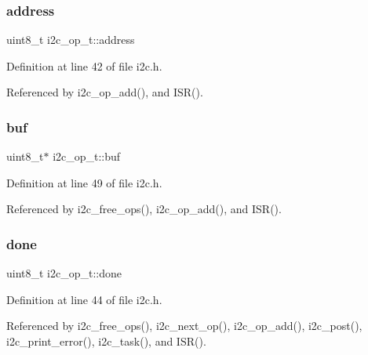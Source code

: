 \subsubsection{\texorpdfstring{address}{address}}
{\footnotesize\ttfamily uint8\+\_\+t i2c\+\_\+op\+\_\+t\+::address}



Definition at line 42 of file i2c.\+h.



Referenced by i2c\+\_\+op\+\_\+add(), and I\+S\+R().

\mbox{\label{structi2c__op__t_a1b38c7b78966e4464cfb858f223bf89a}} 
\subsubsection{\texorpdfstring{buf}{buf}}
{\footnotesize\ttfamily uint8\+\_\+t$\ast$ i2c\+\_\+op\+\_\+t\+::buf}



Definition at line 49 of file i2c.\+h.



Referenced by i2c\+\_\+free\+\_\+ops(), i2c\+\_\+op\+\_\+add(), and I\+S\+R().

\mbox{\label{structi2c__op__t_a281b1e75543e100e4bac1f48d35ecd91}} 
\subsubsection{\texorpdfstring{done}{done}}
{\footnotesize\ttfamily uint8\+\_\+t i2c\+\_\+op\+\_\+t\+::done}



Definition at line 44 of file i2c.\+h.



Referenced by i2c\+\_\+free\+\_\+ops(), i2c\+\_\+next\+\_\+op(), i2c\+\_\+op\+\_\+add(), i2c\+\_\+post(), i2c\+\_\+print\+\_\+error(), i2c\+\_\+task(), and I\+S\+R().

\mbox{\label{structi2c__op__t_a482a75434d75a91f2c3b4c8f37dbe201}} 
